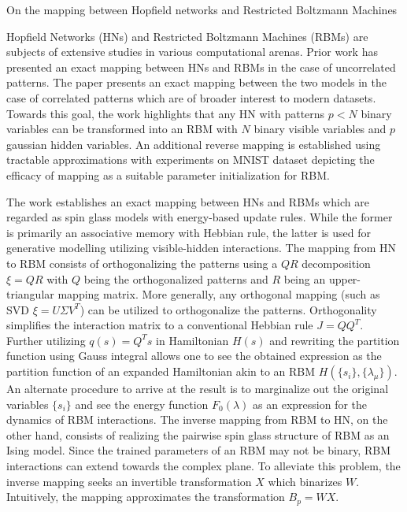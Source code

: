 \documentclass[11pt,letterpaper]{article}
\begin{document}
\begin{center}
  \large{On the mapping between Hopfield networks and Restricted Boltzmann Machines}
\end{center}

Hopfield Networks (HNs) and Restricted Boltzmann Machines (RBMs) are subjects of extensive studies in various computational arenas. Prior work has presented an exact mapping between HNs and RBMs in the case of uncorrelated patterns. The paper presents an exact mapping between the two models in the case of correlated patterns which are of broader interest to modern datasets. Towards this goal, the work highlights that any HN with patterns $p < N$ binary variables can be transformed into an RBM with $N$ binary visible variables and $p$ gaussian hidden variables. An additional reverse mapping is established using tractable approximations with experiments on MNIST dataset depicting the efficacy of mapping as a suitable parameter initialization for RBM.

The work establishes an exact mapping between HNs and RBMs which are regarded as spin glass models with energy-based update rules. While the former is primarily an associative memory with Hebbian rule, the latter is used for generative modelling utilizing visible-hidden interactions. The mapping from HN to RBM consists of orthogonalizing the patterns using a $QR$ decomposition $\xi = QR$ with $Q$ being the orthogonalized patterns and $R$ being an upper-triangular mapping matrix. More generally, any orthogonal mapping (such as SVD $\xi = U\Sigma V^{T}$) can be utilized to orthogonalize the patterns. Orthogonality simplifies the interaction matrix to a conventional Hebbian rule $J = QQ^{T}$. Further utilizing $q(s) = Q^{T}s$ in Hamiltonian $H(s)$ and rewriting the partition function using Gauss integral allows one to see the obtained expression as the partition function of an expanded Hamiltonian akin to an RBM $H(\{s_{i}\},\{\lambda_{\mu}\})$. An alternate procedure to arrive at the result is to marginalize out the original variables $\{s_{i}\}$ and see the energy function $F_{0}(\lambda)$ as an expression for the dynamics of RBM interactions. The inverse mapping from RBM to HN, on the other hand, consists of realizing the pairwise spin glass structure of RBM as an Ising model. Since the trained parameters of an RBM may not be binary, RBM interactions can extend towards the complex plane. To alleviate this problem, the inverse mapping seeks an invertible transformation $X$ which binarizes $W$. Intuitively, the mapping approximates the transformation $B_{p} = WX$. 
\end{document}
